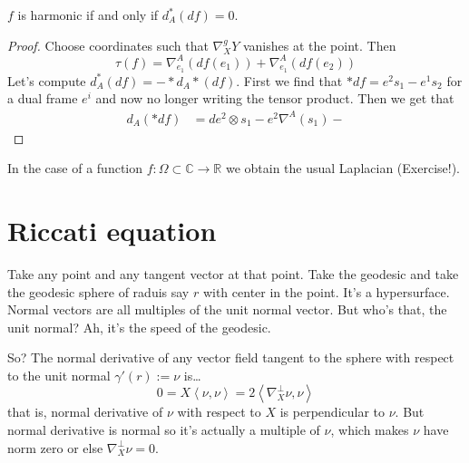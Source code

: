 \begin{lemma}
\label{lemma-harmonic}
$f$ is harmonic if and only if $d_A^*(df)=0$.
\end{lemma}

\begin{proof}
Choose coordinates such that $\nabla^g_XY$ vanishes at the point. Then
$$
\tau(f)=\nabla^A_{e_1}(df(e_1))+\nabla^A_{e_1}(df(e_2))
$$
Let's compute $d_A^*(df)=-*d_A*(df)$. First we find that $*df=e^2s_1-e^1s_2$ for
a dual frame $e^i$ and now no longer writing the tensor product. Then we get
that 
\begin{align*}
d_A(*df)&=de^2\otimes s_1-e^2\nabla^A(s_1)-
\end{align*}

\end{proof}

\begin{remark}
\label{remark-harmonic-functions}
In the case of a function $f:\Omega\subset\mathbb{C}\to \mathbb{R}$ we obtain
the usual Laplacian (Exercise!).
\end{remark}

\section{Riccati equation}
\label{section-Riccati-equation}

Take any point and any tangent vector at that point. Take the geodesic and take
the geodesic sphere of raduis say $r$ with center in the point. It's
a hypersurface. Normal vectors are all multiples of the unit normal vector. But
who's that, the unit normal? Ah, it's the speed of the geodesic.

So? The normal derivative of any vector field tangent to the sphere with respect
to the unit normal $\gamma'(r):=\nu$ is…
$$
0=X\left<\nu,\nu\right>=2\left<\nabla^\perp_X \nu,\nu\right>
$$
that is, normal derivative of $\nu$ with respect to $X$ is perpendicular to
$\nu$. But normal derivative is normal so it's actually a multiple of $\nu$, 
which makes $\nu$ have norm zero or else $\nabla^\perp_X \nu=0$.

